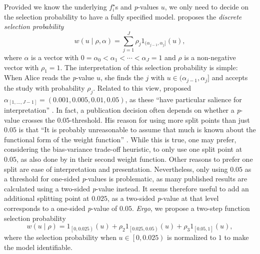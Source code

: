 \documentclass{article}
\theoremstyle{plain}
\theoremstyle{definition}
\begin{document}
Provided we know the underlying $f_{i}^{\star}$s and \textit{p}-values $u$, we only need to decide on the selection probability to have a fully specified model. \citet{hedges1992modeling} proposes the \emph{discrete selection probability}
\begin{equation}
w\left(u\mid\rho,\alpha\right)=\sum_{j=1}^{J}\rho_{j}1_{(\alpha_{j-1},\alpha_{j}]}\left(u\right),\label{eq:Weighted model step function}
\end{equation}
where $\alpha$ is a vector with $0=\alpha_{0}<\alpha_{1}<\cdots<\alpha_{J}=1$ and $\rho$ is a non-negative vector with $\rho_{1}=1$. The interpretation of this selection probability is simple: When Alice reads the \textit{p}-value $u$, she finds the $j$ with $u\in(\alpha_{j-1},\alpha_{j}]$ and accepts the study with probability $\rho_{j}$. Related to this view, \citet{hedges1992modeling} proposed $\alpha_{[1,\dots,J-1]} = \left(0.001,0.005,0.01,0.05\right)$, as these ``have particular salience for interpretation'' \citep{hedges1992modeling}. In fact, a publication decision often depends on whether a \textit{p}-value crosses the $0.05$-threshold. His reason for using more split points than just $0.05$ is that ``It is probably unreasonable to assume that much is known about the functional form of the weight function'' \citep{hedges1992modeling}. While this is true, one may prefer, considering the bias-variance trade-off heuristic, to only use one split point at $0.05$, as also done by \citet{iyengar1988selection} in their second weight function. Other reasons to prefer one split are ease of interpretation and presentation. Nevertheless, only using $0.05$ as a threshold for one-sided \textit{p}-values is problematic, as many published results are calculated using a two-sided \textit{p}-value instead. It seems therefore useful to add an additional splitting point at $0.025$, as a two-sided \textit{p}-value at that level corresponds to a one-sided \textit{p}-value of $0.05$. \emph{Ergo}, we propose a two-step function selection probability
\[
w\left(u\mid\rho\right)=1_{\left[0,0.025\right)}\left(u\right)+\rho_{2}1_{\left[0.025,0.05\right)}\left(u\right)+\rho_{3}1_{\left[0.05,1\right]}\left(u\right),
\]
where the selection probability when $u\in\left[0,0.025\right)$ is normalized to $1$ to make the model identifiable.
\end{document}

